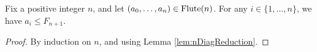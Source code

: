 \begin{proposition}
    \label{prop:FluteBounded}
    Fix a positive integer $n$, and let $(a_0, \ldots, a_n) \in {\rm Flute}(n)$. 
    For any $i \in \{1,\ldots, n\}$, we have $a_i \leq F_{n+1}$. 
\end{proposition}
\begin{proof}
   By induction on $n$, and using Lemma \ref{lem:nDiagReduction}.
\end{proof}
